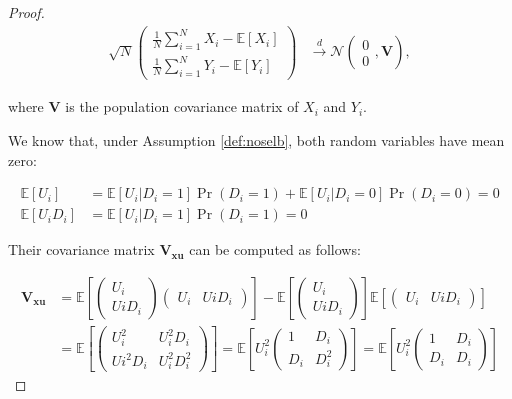 \documentclass[
]{book}
\newcommand{\esp}[1]{\mathbb{E}[ #1 ]}
\theoremstyle{definition}
\theoremstyle{definition}
\theoremstyle{definition}
\theoremstyle{definition}
\theoremstyle{remark}
\begin{document}
\begin{proof}
\begin{align*}
    \sqrt{N}
  \left(
      \begin{array}{c}  
       \frac{1}{N}\sum_{i=1}^NX_i-\esp{X_i}\\   
       \frac{1}{N}\sum_{i=1}^NY_i-\esp{Y_i}
       \end{array}
     \right) 
      &
  \stackrel{d}{\rightarrow}
  \mathcal{N}
  \left(
    \begin{array}{c}    
    0\\
    0
    \end{array},
  \mathbf{V}
  \right),
\end{align*}

where \(\mathbf{V}\) is the population covariance matrix of \(X_i\) and \(Y_i\).

We know that, under Assumption \ref{def:noselb}, both random variables have mean zero:

\begin{align*}
\esp{U_i}& = \esp{U_i|D_i=1}\Pr(D_i=1)+\esp{U_i|D_i=0}\Pr(D_i=0)=0 \\
\esp{U_iD_i}& = \esp{U_i|D_i=1}\Pr(D_i=1)=0
\end{align*}

Their covariance matrix \(\mathbf{V_{xu}}\) can be computed as follows:

\begin{align*}
\mathbf{V_{xu}} & = \esp{\left(\begin{array}{c}  U_i\\  UiD_i\end{array}\right)\left(\begin{array}{cc}  U_i&    UiD_i\end{array}\right)}
                  - \esp{\left(\begin{array}{c} U_i\\   UiD_i\end{array}\right)}\esp{\left(\begin{array}{cc}    U_i&    UiD_i\end{array}\right)}\\
                & = \esp{\left(\begin{array}{cc}    U_i^2 & U_i^2D_i\\  Ui^2D_i & U_i^2D_i^2\end{array}\right)} 
                  = \esp{U_i^2\left(\begin{array}{cc}   1 & D_i\\   D_i & D_i^2\end{array}\right)} 
                  = \esp{U_i^2\left(\begin{array}{cc}   1 & D_i\\   D_i & D_i\end{array}\right)} 
\end{align*}


\end{proof}
\end{document}
